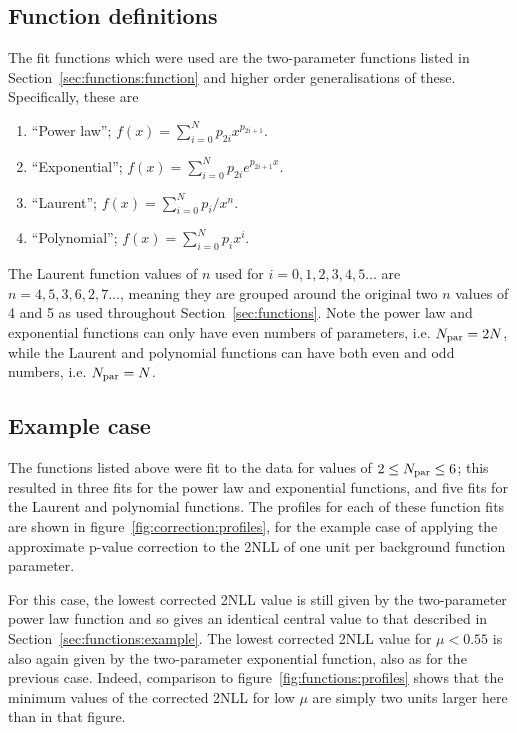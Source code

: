\subsection{Function definitions}
\label{sec:correction:functions}
The fit functions which were used are the two-parameter functions listed in 
Section~\ref{sec:functions:function} and higher order generalisations of
these. Specifically, these are
\begin{enumerate}
\item
``Power law''; $f(x) = \sum_{i=0}^N p_{2i} x^{p_{2i+1}}$.
\item
``Exponential''; $f(x) = \sum_{i=0}^N p_{2i} e^{p_{2i+1}x}$.
\item
``Laurent''; $f(x) = \sum_{i=0}^N p_i/x^n$.
\item
``Polynomial''; $f(x) = \sum_{i=0}^N p_i x^i$.
\end{enumerate}
The Laurent function values of $n$ used for $i=0,1,2,3,4,5\dots$ are
$n=4,5,3,6,2,7\dots$, meaning they are grouped around the original
two $n$ values of 4 and 5 as used throughout Section~\ref{sec:functions}.
Note the power law and exponential functions can only have even numbers of
parameters, i.e. $N_{\rm par}=2N$, while the Laurent and polynomial functions
can have both even and odd numbers, i.e. $N_{\rm par}=N$.


\subsection{Example case}
\label{sec:correction:example}

The functions listed above were fit to the data for values of 
$2 \le N_{\rm par} \le 6$; this resulted in three fits for the power law and
exponential functions, and five fits for the Laurent and polynomial functions.
The profiles for each of these function fits are shown in
figure~\ref{fig:correction:profiles}, for the example case of 
applying the approximate p-value correction to the 2NLL of one unit per 
background function parameter.

For this case, the lowest corrected 2NLL value is still given by the
two-parameter power law function and so gives an identical central value
to that described in Section~\ref{sec:functions:example}. The lowest corrected
2NLL value for $\mu < 0.55$ is also again given by the two-parameter exponential
function, also as for the previous case. 
Indeed, comparison to figure~\ref{fig:functions:profiles} shows that the
minimum values of the corrected 2NLL for low $\mu$
are simply two units larger here than in that figure.


